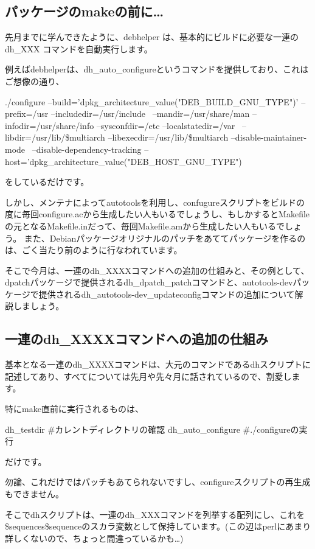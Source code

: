 \documentclass[mingoth,a4paper]{jsarticle}
\begin{document}
\subsection{パッケージのmakeの前に…}

先月までに学んできたように、debhelper は、基本的にビルドに必要な一連のdh\_XXX コマンドを自動実行します。

例えばdebhelperは、dh\_auto\_configureというコマンドを提供しており、これはご想像の通り、
\begin{commandline}
./configure --build='dpkg_architecture_value("DEB_BUILD_GNU_TYPE")' --prefix=/usr --includedir=/usr/include \
--mandir=/usr/share/man --infodir=/usr/share/info --sysconfdir=/etc --localstatedir=/var \
--libdir=/usr/lib/\$multiarch --libexecdir=/usr/lib/\$multiarch --disable-maintainer-mode \
--disable-dependency-tracking --host='dpkg_architecture_value("DEB_HOST_GNU_TYPE")
\end{commandline}
をしているだけです。

しかし、メンテナによってautotoolsを利用し、confugureスクリプトをビルドの度に毎回configure.acから生成したい人もいるでしょうし、もしかするとMakefileの元となるMakefile.inだって、毎回Makefile.amから生成したい人もいるでしょう。
また、Debianパッケージオリジナルのパッチをあててパッケージを作るのは、ごく当たり前のように行なわれています。

そこで今月は、一連のdh\_XXXXコマンドへの追加の仕組みと、その例として、dpatchパッケージで提供されるdh\_dpatch\_patchコマンドと、autotools-devパッケージで提供されるdh\_autotools-dev\_updateconfigコマンドの追加について解説しましょう。

\subsection{一連のdh\_XXXXコマンドへの追加の仕組み}

基本となる一連のdh\_XXXXコマンドは、大元のコマンドであるdhスクリプトに記述してあり、すべてについては先月や先々月に話されているので、割愛します。

特にmake直前に実行されるものは、
\begin{commandline}
dh_testdir  #カレントディレクトリの確認
dh_auto_configure  #./configureの実行
\end{commandline}
だけです。

勿論、これだけではパッチもあてられないですし、configureスクリプトの再生成もできません。

そこでdhスクリプトは、一連のdh\_XXXコマンドを列挙する配列にし、これを\$sequences{\$sequence}のスカラ変数として保持しています。(この辺はperlにあまり詳しくないので、ちょっと間違っているかも…)
\end{document}
